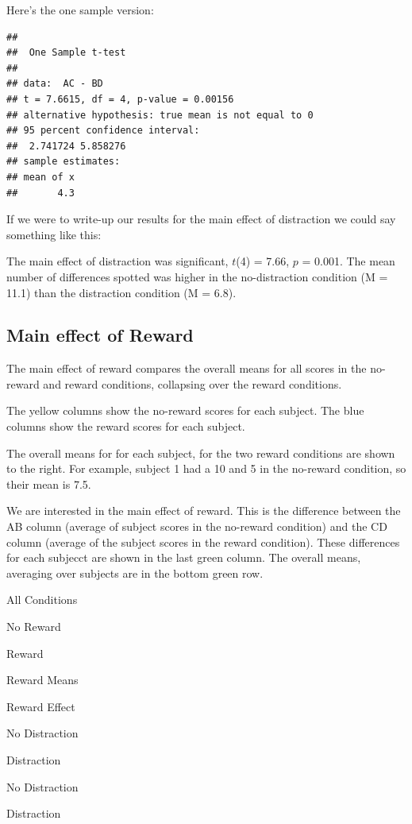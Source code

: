 \documentclass[
]{book}
\begin{document}
Here's the one sample version:

\begin{verbatim}
## 
## 	One Sample t-test
## 
## data:  AC - BD
## t = 7.6615, df = 4, p-value = 0.00156
## alternative hypothesis: true mean is not equal to 0
## 95 percent confidence interval:
##  2.741724 5.858276
## sample estimates:
## mean of x 
##       4.3
\end{verbatim}

If we were to write-up our results for the main effect of distraction we could say something like this:

The main effect of distraction was significant, \(t\)(4) = 7.66, \(p\) = 0.001. The mean number of differences spotted was higher in the no-distraction condition (M = 11.1) than the distraction condition (M = 6.8).

\hypertarget{main-effect-of-reward}{%
\subsection{Main effect of Reward}\label{main-effect-of-reward}}

The main effect of reward compares the overall means for all scores in the no-reward and reward conditions, collapsing over the reward conditions.

The yellow columns show the no-reward scores for each subject. The blue columns show the reward scores for each subject.

The overall means for for each subject, for the two reward conditions are shown to the right. For example, subject 1 had a 10 and 5 in the no-reward condition, so their mean is 7.5.

We are interested in the main effect of reward. This is the difference between the AB column (average of subject scores in the no-reward condition) and the CD column (average of the subject scores in the reward condition). These differences for each subjecct are shown in the last green column. The overall means, averaging over subjects are in the bottom green row.

All Conditions

No Reward

Reward

Reward Means

Reward Effect

No Distraction

Distraction

No Distraction

Distraction
\end{document}
